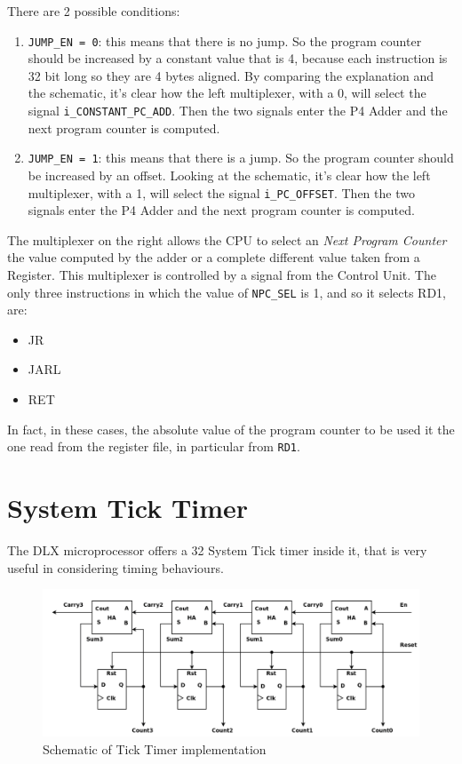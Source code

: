 There are 2 possible conditions:

\begin{enumerate}
  \item \texttt{JUMP\_EN = 0}: this means that there is no jump. So the program counter should be increased by a constant value that is 4, because each instruction is 32 bit long so they are 4 bytes aligned. By comparing the explanation and the schematic, it's clear how the left multiplexer, with a 0, will select the signal \texttt{i\_CONSTANT\_PC\_ADD}. Then the two signals enter the P4 Adder and the next program counter is computed.  
  \item \texttt{JUMP\_EN = 1}: this means that there is a jump. So the program counter should be increased by an offset. Looking at the schematic, it's clear how the left multiplexer, with a 1, will select the signal \texttt{i\_PC\_OFFSET}. Then the two signals enter the P4 Adder and the next program counter is computed. 
\end{enumerate}

The multiplexer on the right allows the CPU to select an \emph{Next Program Counter} the value computed by the adder or a complete different value taken from  a Register. This multiplexer is controlled by a signal from the Control Unit. The only three instructions in which the value of \texttt{NPC\_SEL} is 1, and so it selects RD1, are:

\begin{itemize}
  \item JR
  \item JARL
  \item RET
\end{itemize}

In fact, in these cases, the absolute value of the program counter to be used it the one read from the register file, in particular from \texttt{RD1}.

\newpage
\section{System Tick Timer}

The DLX microprocessor offers a 32 System Tick timer inside it, that is very useful in considering timing behaviours.

\begin{figure}[H]
	\centering
	\includegraphics[width=1.0\textwidth]{chapters/4_DecodeStage/images/ha_counter.png}
	\caption{Schematic of Tick Timer implementation}
	\label{ticktmr_hacounter}
\end{figure}

